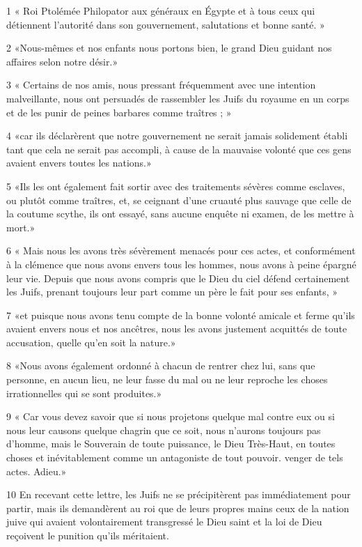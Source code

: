 \par 1 « Roi Ptolémée Philopator aux généraux en Égypte et à tous ceux qui détiennent l'autorité dans son gouvernement, salutations et bonne santé. »
\par 2 «Nous-mêmes et nos enfants nous portons bien, le grand Dieu guidant nos affaires selon notre désir.»
\par 3 « Certains de nos amis, nous pressant fréquemment avec une intention malveillante, nous ont persuadés de rassembler les Juifs du royaume en un corps et de les punir de peines barbares comme traîtres ; »
\par 4 «car ils déclarèrent que notre gouvernement ne serait jamais solidement établi tant que cela ne serait pas accompli, à cause de la mauvaise volonté que ces gens avaient envers toutes les nations.»
\par 5 «Ils les ont également fait sortir avec des traitements sévères comme esclaves, ou plutôt comme traîtres, et, se ceignant d'une cruauté plus sauvage que celle de la coutume scythe, ils ont essayé, sans aucune enquête ni examen, de les mettre à mort.»
\par 6 « Mais nous les avons très sévèrement menacés pour ces actes, et conformément à la clémence que nous avons envers tous les hommes, nous avons à peine épargné leur vie. Depuis que nous avons compris que le Dieu du ciel défend certainement les Juifs, prenant toujours leur part comme un père le fait pour ses enfants, »
\par 7 «et puisque nous avons tenu compte de la bonne volonté amicale et ferme qu'ils avaient envers nous et nos ancêtres, nous les avons justement acquittés de toute accusation, quelle qu'en soit la nature.»
\par 8 «Nous avons également ordonné à chacun de rentrer chez lui, sans que personne, en aucun lieu, ne leur fasse du mal ou ne leur reproche les choses irrationnelles qui se sont produites.»
\par 9 « Car vous devez savoir que si nous projetons quelque mal contre eux ou si nous leur causons quelque chagrin que ce soit, nous n'aurons toujours pas d'homme, mais le Souverain de toute puissance, le Dieu Très-Haut, en toutes choses et inévitablement comme un antagoniste de tout pouvoir. venger de tels actes. Adieu.»
\par 10 En recevant cette lettre, les Juifs ne se précipitèrent pas immédiatement pour partir, mais ils demandèrent au roi que de leurs propres mains ceux de la nation juive qui avaient volontairement transgressé le Dieu saint et la loi de Dieu reçoivent le punition qu'ils méritaient.
